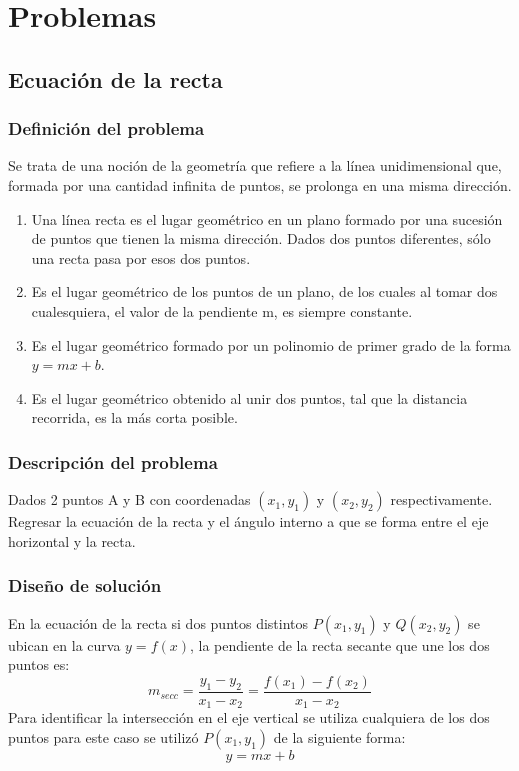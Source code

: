 \section{Problemas}
\subsection{Ecuación de la recta}
\subsubsection{Definición del problema}
Se trata de una noción de la geometría que refiere a la línea unidimensional que, formada por una cantidad infinita de puntos, se prolonga en una misma dirección.
\begin{enumerate}
    \item Una línea recta es el lugar geométrico en un plano formado por una sucesión de puntos que tienen la misma dirección. Dados dos puntos diferentes, sólo una recta pasa por esos dos puntos.
    \item Es el lugar geométrico de los puntos de un plano, de los cuales al tomar dos cualesquiera, el valor de la pendiente m, es siempre constante.
    \item Es el lugar geométrico formado por un polinomio de primer grado de la forma $y= mx + b$.
    \item Es el lugar geométrico obtenido al unir dos puntos, tal que la distancia recorrida, es la más corta posible.
    \end{enumerate}
\subsubsection{Descripción del problema}
Dados 2 puntos A y B con coordenadas $(x_1, y_1)$ y $(x_2,y_2)$ respectivamente. Regresar la ecuación de la recta y el ángulo interno a que se forma entre el eje horizontal y la recta.
\subsubsection{Diseño de solución}
En la ecuación de la recta si dos puntos distintos $P(x_{1},y_{1})$ y $Q(x_{2},y_{2})$ se ubican en la curva $y=f(x)$, la pendiente de la recta secante que une los dos puntos es: 
\begin{equation}
    m_{secc} = \frac{y_{1}-y_{2}}{x_{1}-x_{2}} = \frac{f(x_{1})-f(x_{2})}{x_{1}-x_{2}}
\end{equation}
Para identificar la intersección en el eje vertical se utiliza cualquiera de los dos puntos para este caso se utilizó $P(x_{1},y_{1})$ de la siguiente forma:
\begin{equation}
    y = mx + b
\end{equation}

